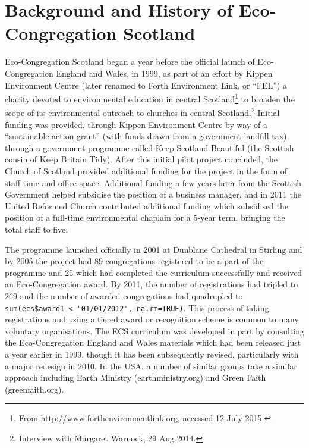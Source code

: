 \documentclass[11pt,]{article}
\let\rmarkdownfootnote\footnote%
\def\footnote{\protect\rmarkdownfootnote}
\begin{document}
\hypertarget{background-and-history-of-eco-congregation-scotland}{%
\section{Background and History of Eco-Congregation
Scotland}\label{background-and-history-of-eco-congregation-scotland}}

Eco-Congregation Scotland began a year before the official launch of
Eco-Congregation England and Wales, in 1999, as part of an effort by
Kippen Environment Centre (later renamed to Forth Environment Link, or
``FEL'') a charity devoted to environmental education in central
Scotland\footnote{From \url{http://www.forthenvironmentlink.org},
  accessed 12 July 2015.} to broaden the scope of its environmental
outreach to churches in central Scotland.\footnote{Interview with
  Margaret Warnock, 29 Aug 2014.} Initial funding was provided, through
Kippen Environment Centre by way of a ``sustainable action grant'' (with
funds drawn from a government landfill tax) through a government
programme called Keep Scotland Beautiful (the Scottish cousin of Keep
Britain Tidy). After this initial pilot project concluded, the Church of
Scotland provided additional funding for the project in the form of
staff time and office space. Additional funding a few years later from
the Scottish Government helped subsidise the position of a business
manager, and in 2011 the United Reformed Church contributed additional
funding which subsidised the position of a full-time environmental
chaplain for a 5-year term, bringing the total staff to five.

The programme launched officially in 2001 at Dunblane Cathedral in
Stirling and by 2005 the project had 89 congregations registered to be a
part of the programme and 25 which had completed the curriculum
successfully and received an Eco-Congregation award. By 2011, the number
of registrations had tripled to 269 and the number of awarded
congregations had quadrupled to
\texttt{sum(ecs\$award1\ \textless{}\ "01/01/2012",\ na.rm=TRUE)}. This
process of taking registrations and using a tiered award or recognition
scheme is common to many voluntary organisations. The ECS curriculum was
developed in part by consulting the Eco-Congregation England and Wales
materials which had been released just a year earlier in 1999, though it
has been subsequently revised, particularly with a major redesign in
2010. In the USA, a number of similar groups take a similar approach
including Earth Ministry (earthministry.org) and Green Faith
(greenfaith.org).
\end{document}
